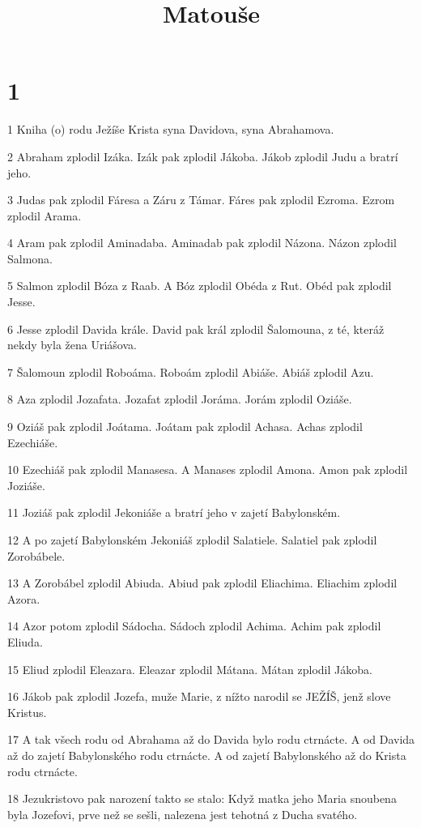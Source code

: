 

\title{Matouše}

\chapter{1}

\par 1 Kniha (o) rodu Ježíše Krista syna Davidova, syna Abrahamova.
\par 2 Abraham zplodil Izáka. Izák pak zplodil Jákoba. Jákob zplodil Judu a bratrí jeho.
\par 3 Judas pak zplodil Fáresa a Záru z Támar. Fáres pak zplodil Ezroma. Ezrom zplodil Arama.
\par 4 Aram pak zplodil Aminadaba. Aminadab pak zplodil Názona. Názon zplodil Salmona.
\par 5 Salmon zplodil Bóza z Raab. A Bóz zplodil Obéda z Rut. Obéd pak zplodil Jesse.
\par 6 Jesse zplodil Davida krále. David pak král zplodil Šalomouna, z té, kteráž nekdy byla žena Uriášova.
\par 7 Šalomoun zplodil Roboáma. Roboám zplodil Abiáše. Abiáš zplodil Azu.
\par 8 Aza zplodil Jozafata. Jozafat zplodil Joráma. Jorám zplodil Oziáše.
\par 9 Oziáš pak zplodil Joátama. Joátam pak zplodil Achasa. Achas zplodil Ezechiáše.
\par 10 Ezechiáš pak zplodil Manasesa. A Manases zplodil Amona. Amon pak zplodil Joziáše.
\par 11 Joziáš pak zplodil Jekoniáše a bratrí jeho v zajetí Babylonském.
\par 12 A po zajetí Babylonském Jekoniáš zplodil Salatiele. Salatiel pak zplodil Zorobábele.
\par 13 A Zorobábel zplodil Abiuda. Abiud pak zplodil Eliachima. Eliachim zplodil Azora.
\par 14 Azor potom zplodil Sádocha. Sádoch zplodil Achima. Achim pak zplodil Eliuda.
\par 15 Eliud zplodil Eleazara. Eleazar zplodil Mátana. Mátan zplodil Jákoba.
\par 16 Jákob pak zplodil Jozefa, muže Marie, z nížto narodil se JEŽÍŠ, jenž slove Kristus.
\par 17 A tak všech rodu od Abrahama až do Davida bylo rodu ctrnácte. A od Davida až do zajetí Babylonského rodu ctrnácte. A od zajetí Babylonského až do Krista rodu ctrnácte.
\par 18 Jezukristovo pak narození takto se stalo: Když matka jeho Maria snoubena byla Jozefovi, prve než se sešli, nalezena jest tehotná z Ducha svatého.
